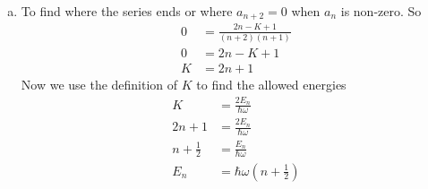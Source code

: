 \documentclass[11pt]{article}
\numberwithin{equation}{section}
\begin{document}
\begin{enumerate}[(a)]
\item
To find where the series ends or where $a_{n+2} = 0$ when $a_n$ is non-zero. So
\begin{align*}
0 &= \frac{2n - K + 1}{(n+2)(n+1)}\\
0 &= 2n - K + 1\\
K &= 2n+1
\end{align*}
Now we use the definition of $K$ to find the allowed energies
\begin{align*}
K &= \frac{2E_n}{\hbar\omega}\\
2n+1 &= \frac{2E_n}{\hbar\omega}\\
n+\frac{1}{2} &= \frac{E_n}{\hbar\omega}\\
E_n &= \hbar\omega\left(n+\frac{1}{2}\right)
\end{align*}
\end{enumerate}
\end{document}
